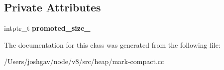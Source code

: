 \subsection*{Private Attributes}
\begin{DoxyCompactItemize}
\item 
intptr\+\_\+t {\bfseries promoted\+\_\+size\+\_\+}\hypertarget{classv8_1_1internal_1_1_mark_compact_collector_1_1_evacuate_new_space_page_visitor_a943ea43cd2eefafdc68bb351c6bae7c4}{}\label{classv8_1_1internal_1_1_mark_compact_collector_1_1_evacuate_new_space_page_visitor_a943ea43cd2eefafdc68bb351c6bae7c4}

\end{DoxyCompactItemize}


The documentation for this class was generated from the following file\+:\begin{DoxyCompactItemize}
\item 
/\+Users/joshgav/node/v8/src/heap/mark-\/compact.\+cc\end{DoxyCompactItemize}
